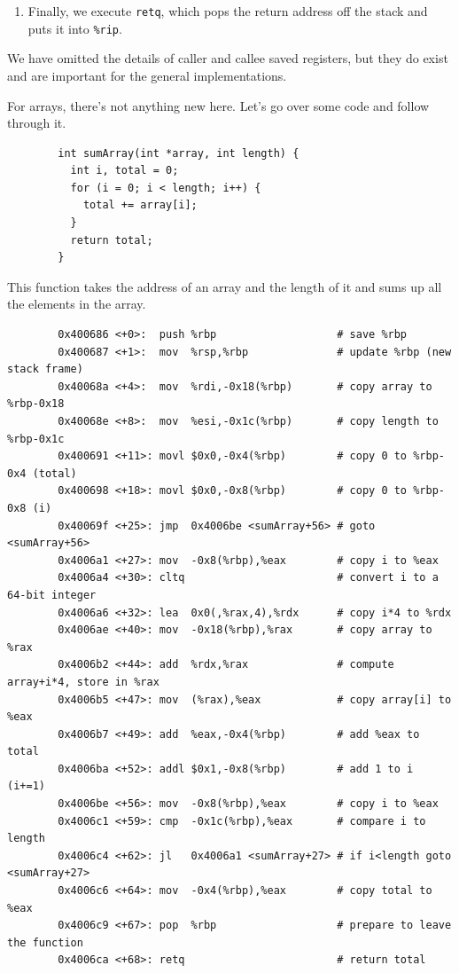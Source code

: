 \documentclass{article}
\begin{document}
\begin{example}
\begin{enumerate}
          \item Finally, we execute \texttt{retq}, which pops the return address off the stack and puts it into \texttt{\%rip}. 
        \end{enumerate}
      \end{example}

      We have omitted the details of caller and callee saved registers, but they do exist and are important for the general implementations. 

      For arrays, there's not anything new here. Let's go over some code and follow through it. 

      \begin{lstlisting}
        int sumArray(int *array, int length) {
          int i, total = 0;
          for (i = 0; i < length; i++) {
            total += array[i];
          }
          return total;
        }
      \end{lstlisting}

      This function takes the address of an array and the length of it and sums up all the elements in the array. 

      \begin{lstlisting}
        0x400686 <+0>:	push %rbp                   # save %rbp
        0x400687 <+1>:	mov  %rsp,%rbp              # update %rbp (new stack frame)
        0x40068a <+4>:	mov  %rdi,-0x18(%rbp)       # copy array to %rbp-0x18
        0x40068e <+8>:	mov  %esi,-0x1c(%rbp)       # copy length to %rbp-0x1c
        0x400691 <+11>:	movl $0x0,-0x4(%rbp)        # copy 0 to %rbp-0x4 (total)
        0x400698 <+18>:	movl $0x0,-0x8(%rbp)        # copy 0 to %rbp-0x8 (i)
        0x40069f <+25>:	jmp  0x4006be <sumArray+56> # goto <sumArray+56>
        0x4006a1 <+27>:	mov  -0x8(%rbp),%eax        # copy i to %eax
        0x4006a4 <+30>:	cltq                        # convert i to a 64-bit integer
        0x4006a6 <+32>:	lea  0x0(,%rax,4),%rdx      # copy i*4 to %rdx
        0x4006ae <+40>:	mov  -0x18(%rbp),%rax       # copy array to %rax
        0x4006b2 <+44>:	add  %rdx,%rax              # compute array+i*4, store in %rax
        0x4006b5 <+47>:	mov  (%rax),%eax            # copy array[i] to %eax
        0x4006b7 <+49>:	add  %eax,-0x4(%rbp)        # add %eax to total
        0x4006ba <+52>:	addl $0x1,-0x8(%rbp)        # add 1 to i (i+=1)
        0x4006be <+56>:	mov  -0x8(%rbp),%eax        # copy i to %eax
        0x4006c1 <+59>:	cmp  -0x1c(%rbp),%eax       # compare i to length
        0x4006c4 <+62>:	jl   0x4006a1 <sumArray+27> # if i<length goto <sumArray+27>
        0x4006c6 <+64>:	mov  -0x4(%rbp),%eax        # copy total to %eax
        0x4006c9 <+67>:	pop  %rbp                   # prepare to leave the function
        0x4006ca <+68>:	retq                        # return total
      \end{lstlisting}
\end{document}
